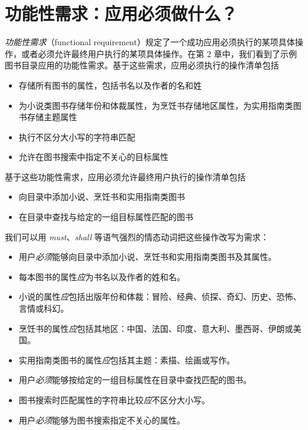 \section{功能性需求：应用必须做什么？}

\emph{功能性需求}（functional requirement）规定了一个成功应用必须执行的某项具体操作，或者必须允许最终用户执行的某项具体操作。在第 2 章中，我们看到了示例图书目录应用的功能性需求。基于这些需求，应用必须执行的操作清单包括

\begin{itemize}
\item 存储所有图书的属性，包括书名以及作者的名和姓
\item 为小说类图书存储年份和体裁属性，为烹饪书存储地区属性，为实用指南类图书存储主题属性
\item 执行不区分大小写的字符串匹配
\item 允许在图书搜索中指定不关心的目标属性
\end{itemize}

基于这些功能性需求，应用必须允许最终用户执行的操作清单包括

\begin{itemize}
\item 向目录中添加小说、烹饪书和实用指南类图书
\item 在目录中查找与给定的一组目标属性匹配的图书
\end{itemize}

我们可以用 \emph{must}、\emph{shall} 等语气强烈的情态动词把这些操作改写为需求：

\begin{itemize}
\item 用户\emph{必须}能够向目录中添加小说、烹饪书和实用指南类图书及其属性。
\item 每本图书的属性\emph{应}为书名以及作者的姓和名。
\item 小说的属性\emph{应}包括出版年份和体裁：冒险、经典、侦探、奇幻、历史、恐怖、言情或科幻。
\item 烹饪书的属性\emph{应}包括其地区：中国、法国、印度、意大利、墨西哥、伊朗或美国。
\item 实用指南类图书的属性\emph{应}包括其主题：素描、绘画或写作。
\item 用户\emph{必须}能够按给定的一组目标属性在目录中查找匹配的图书。
\item 图书搜索时匹配属性的字符串比较\emph{应}不区分大小写。
\item 用户\emph{必须}能够为图书搜索指定不关心的属性。
\end{itemize}

